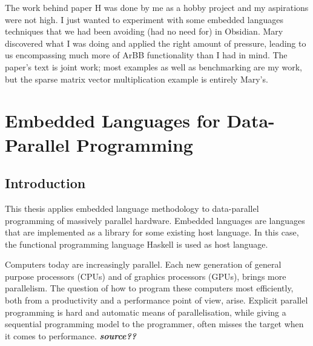 \documentclass[a4paper]{book}
\newcommand{\thesistitle}{Embedded Languages for Data-Parallel Programming}
\begin{document}
The work behind paper H was done by me as a hobby project and my aspirations were not 
high. I just wanted to experiment with some embedded languages techniques that we had 
been avoiding (had no need for) in Obsidian. Mary discovered what I was doing and applied 
the right amount of pressure, leading to us encompassing much more of ArBB functionality than 
I had in mind. The paper's text is joint work; most examples as well as benchmarking are my work,
but the sparse matrix vector multiplication example is entirely Mary's. 



\tableofcontents


\cleardoublepage
\clearpage

\pagestyle{fancy}
\fancyfoot{}
\fancyhead[LO]{}
\fancyhead[RO]{\leftmark}
\renewcommand{\headrulewidth}{0.0pt}
\fancyhead[LE,RO]{\thepage}

%
%
\chapter{\thesistitle}

\section{Introduction} 

This thesis applies embedded language methodology to data-parallel programming of 
massively parallel hardware. Embedded languages are languages that are implemented 
as a library for some existing host language. In this case, the functional programming 
language Haskell is used as host language. 

Computers today are increasingly parallel. Each new generation of general purpose processors
(CPUs) and of graphics processors (GPUs), brings more parallelism. The question 
of how to program these computers most efficiently, both from a productivity and 
a performance point of view, arise. Explicit parallel programming is hard and automatic 
means of parallelisation, while giving a sequential programming model to the programmer, 
often misses the target when it comes to performance. {\bf \emph{source??}} 
\end{document}
